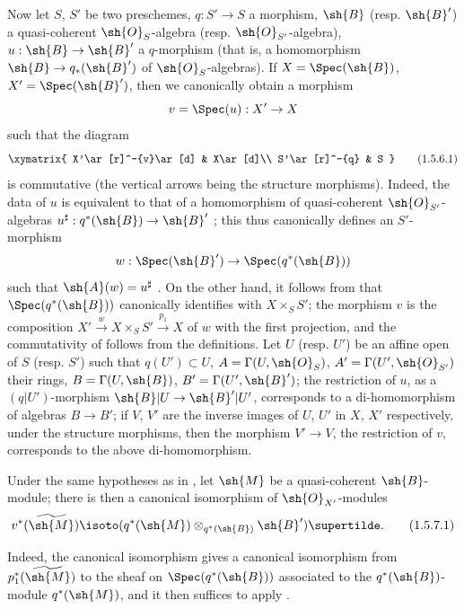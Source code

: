 \begin{env}[1.5.6]
\label{II.1.5.6}
Now let $S$, $S'$ be two preschemes, $q:S'\to S$ a morphism, $\sh{B}$ (resp. $\sh{B}'$) a quasi-coherent $\sh{O}_S$-algebra (resp. $\sh{O}_{S'}$-algebra), $u:\sh{B}\to\sh{B}'$ a $q$-morphism (that is, a homomorphism $\sh{B}\to q_*(\sh{B}')$ of $\sh{O}_S$-algebras).
If $X=\Spec(\sh{B})$, $X'=\Spec(\sh{B}')$, then we canonically obtain a morphism
\[
  v=\Spec(u):X'\to X
\]
such that the diagram
\[
\label{II.1.5.6.1}
  \xymatrix{
    X'\ar[r]^-{v}\ar[d] & X\ar[d]\\
    S'\ar[r]^-{q} & S
  }
  \tag{1.5.6.1}
\]
is commutative (the vertical arrows being the structure morphisms).
Indeed, the data of $u$ is equivalent to that of a homomorphism of quasi-coherent $\sh{O}_{S'}$-algebras $u^\sharp:q^*(\sh{B})\to\sh{B}'$ ; this thus canonically defines an $S'$-morphism
\[
  w:\Spec(\sh{B}')\to\Spec(q^*(\sh{B}))
\]
such that $\sh{A}(w)=u^\sharp$ .
On the other hand, it follows from  that $\Spec(q^*(\sh{B}))$ canonically identifies with $X\times_S S'$; the morphism $v$ is the composition $X'\xrightarrow{w}X\times_S S'\xrightarrow{p_1}X$ of $w$ with the first projection, and the commutativity of  follows from the definitions.
Let $U$ (resp. $U'$) be an affine open of $S$ (resp. $S'$) such that $q(U')\subset U$, $A=\Gamma(U,\sh{O}_S)$, $A'=\Gamma(U',\sh{O}_{S'})$ their rings, $B=\Gamma(U,\sh{B})$, $B'=\Gamma(U',\sh{B}')$; the restriction of $u$, as a $(q|U')$-morphism $\sh{B}|U\to\sh{B}'|U'$, corresponds to a di-homomorphism of algebras $B\to B'$; if $V$, $V'$ are the inverse images of $U$, $U'$ in $X$, $X'$ respectively, under the structure morphisms, then the morphism $V'\to V$, the restriction of $v$, corresponds  to the above di-homomorphism.
\end{env}

\begin{env}[1.5.7]
\label{II.1.5.7}
Under the same hypotheses as in , let $\sh{M}$ be a quasi-coherent $\sh{B}$-module; there is then a canonical isomorphism of $\sh{O}_{X'}$-modules
\[
\label{II.1.5.7.1}
  v^*(\widetilde{\sh{M}})\isoto(q^*(\sh{M})\otimes_{q^*(\sh{B})}\sh{B}')\supertilde.
  \tag{1.5.7.1}
\]

Indeed, the canonical isomorphism  gives a canonical isomorphism from $p_1^*(\widetilde{\sh{M}})$ to the sheaf on $\Spec(q^*(\sh{B}))$ associated to the $q^*(\sh{B})$-module $q^*(\sh{M})$, and it then suffices to apply .
\end{env}

